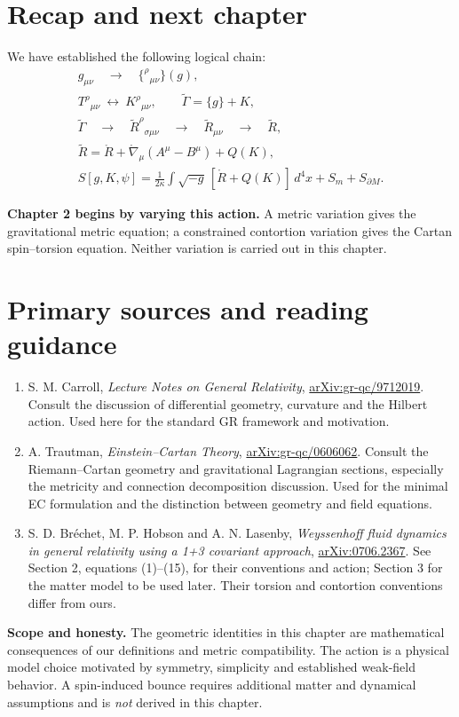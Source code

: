 \documentclass[11pt,a4paper]{article}
\newcommand{\LC}{\mathring{\nabla}}
\newcommand{\RR}{\mathring{R}}
\begin{document}
\section{Recap and next chapter}
We have established the following logical chain:
\begin{equation*}
\boxed{\begin{gathered}
g_{\mu\nu}\quad \longrightarrow\quad \{^\rho{}_{\mu\nu}\}(g),\\
T^\rho{}_{\mu\nu}\ \longleftrightarrow\ K^\rho{}_{\mu\nu},\qquad
\widetilde\Gamma=\{g\}+K,\\
\widetilde\Gamma\quad\longrightarrow\quad\widetilde R^\rho{}_{\sigma\mu\nu}
\quad\longrightarrow\quad\widetilde R_{\mu\nu}\quad\longrightarrow\quad\widetilde R,\\
\widetilde R=\RR+\LC_\mu(A^\mu-B^\mu)+Q(K),\\
S[g,K,\psi]=\frac1{2\kappa}\int\sqrt{-g}\,[\RR+Q(K)]\,d^4x+S_m+S_{\partial M}.
\end{gathered}}
\end{equation*}

\textbf{Chapter 2 begins by varying this action.} A metric variation gives the gravitational metric equation; a constrained contortion variation gives the Cartan spin--torsion equation. Neither variation is carried out in this chapter.

\section*{Primary sources and reading guidance}
\begin{enumerate}[leftmargin=*,itemsep=3pt]
\item S. M. Carroll, \emph{Lecture Notes on General Relativity}, \href{https://arxiv.org/abs/gr-qc/9712019}{arXiv:gr-qc/9712019}. Consult the discussion of differential geometry, curvature and the Hilbert action. Used here for the standard GR framework and motivation.
\item A. Trautman, \emph{Einstein--Cartan Theory}, \href{https://arxiv.org/abs/gr-qc/0606062}{arXiv:gr-qc/0606062}. Consult the Riemann--Cartan geometry and gravitational Lagrangian sections, especially the metricity and connection decomposition discussion. Used for the minimal EC formulation and the distinction between geometry and field equations.
\item S. D. Br\'echet, M. P. Hobson and A. N. Lasenby, \emph{Weyssenhoff fluid dynamics in general relativity using a 1+3 covariant approach}, \href{https://arxiv.org/abs/0706.2367}{arXiv:0706.2367}. See Section 2, equations (1)--(15), for their conventions and action; Section 3 for the matter model to be used later. Their torsion and contortion conventions differ from ours.
\end{enumerate}
\begin{whybox}\textbf{Scope and honesty.} The geometric identities in this chapter are mathematical consequences of our definitions and metric compatibility. The action is a physical model choice motivated by symmetry, simplicity and established weak-field behavior. A spin-induced bounce requires additional matter and dynamical assumptions and is \emph{not} derived in this chapter.\end{whybox}
\end{document}
